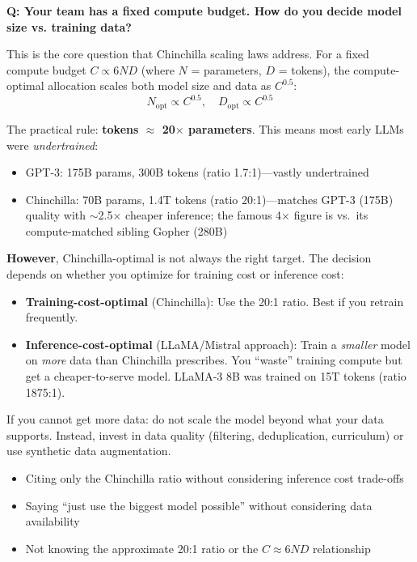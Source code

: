 \begin{interviewq}
\textbf{Q: Your team has a fixed compute budget. How do you decide model size vs. training data?}

 \quad {} \quad \badgefreq{\freqhigh}

\stronganswer
This is the core question that Chinchilla scaling laws address. For a fixed compute budget $C \propto 6ND$ (where $N$ = parameters, $D$ = tokens), the compute-optimal allocation scales both model size and data as $C^{0.5}$:
\[N_{\text{opt}} \propto C^{0.5}, \quad D_{\text{opt}} \propto C^{0.5}\]

The practical rule: \textbf{tokens $\approx$ 20$\times$ parameters}. This means most early LLMs were \textit{undertrained}:
\begin{itemize}
    \item GPT-3: 175B params, 300B tokens (ratio 1.7:1)---vastly undertrained
    \item Chinchilla: 70B params, 1.4T tokens (ratio 20:1)---matches GPT-3 (175B) quality with $\sim$2.5$\times$ cheaper inference; the famous 4$\times$ figure is vs.\ its compute-matched sibling Gopher (280B)
\end{itemize}

\textbf{However}, Chinchilla-optimal is not always the right target. The decision depends on whether you optimize for training cost or inference cost:
\begin{itemize}
    \item \textbf{Training-cost-optimal} (Chinchilla): Use the 20:1 ratio. Best if you retrain frequently.
    \item \textbf{Inference-cost-optimal} (LLaMA/Mistral approach): Train a \textit{smaller} model on \textit{more} data than Chinchilla prescribes. You ``waste'' training compute but get a cheaper-to-serve model. LLaMA-3 8B was trained on 15T tokens (ratio 1875:1).
\end{itemize}

If you cannot get more data: do not scale the model beyond what your data supports. Instead, invest in data quality (filtering, deduplication, curriculum) or use synthetic data augmentation.

\redflags
\begin{itemize}
    \item Citing only the Chinchilla ratio without considering inference cost trade-offs
    \item Saying ``just use the biggest model possible'' without considering data availability
    \item Not knowing the approximate 20:1 ratio or the $C \approx 6ND$ relationship
\end{itemize}


\end{interviewq}

